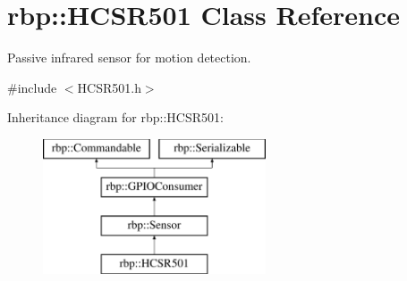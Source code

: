 \hypertarget{classrbp_1_1HCSR501}{}\section{rbp\+:\+:H\+C\+S\+R501 Class Reference}
\label{classrbp_1_1HCSR501}


Passive infrared sensor for motion detection.  




{\ttfamily \#include $<$H\+C\+S\+R501.\+h$>$}

Inheritance diagram for rbp\+:\+:H\+C\+S\+R501\+:\begin{figure}[H]
\begin{center}
\leavevmode
\includegraphics[height=4.000000cm]{classrbp_1_1HCSR501}
\end{center}
\end{figure}
